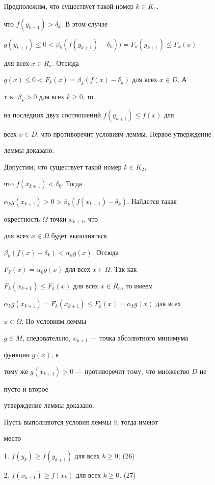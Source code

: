 \begin{pf} Предположим, что существует такой номер $k\in K_1$, 


что $f(y_{k+1})>\delta_k$. В этом случае 


$g(y_{k+1})\le 0<\beta_k(f(y_{k+1})-\delta_k))= 


F_k(y_{k+1})\le F_k(x)$ 


для всех $x\in R_n$. Отсюда 


$g(x)\le 0<F_k(x)=\beta_k(f(x)-\delta_k)$ для всех $x\in D$. А 


т.\,к.{} $\beta_k>0$ для всех $k\ge 0$, то  


из последних двух соотношений $f(y_{k+1})\le f(x)$ для 


всех $x\in D$, что противоречит условиям леммы. Первое утверждение 


леммы доказано. 


 


Допустим, что существует такой номер $k\in K_2$,


что $f(x_{k+1})<\delta_k$. Тогда 


$\alpha_k g(x_{k+1})>0>\beta_k(f(x_{k+1})-\delta_k)$. Найдется такая 


окрестность $\Omega$ точки $x_{k+1}$, что 


для всех $x\in\Omega$ будет выполняться 


$\beta_k(f(x)-\delta_k)<\alpha_k g(x)$. Отсюда 


$F_k(x)=\alpha_k g(x)$ для всех $x\in\Omega$. Так как 


$F_k(x_{k+1})\le{}F_k(x)$ для всех $x\in R_n$, то имеем 


$\alpha_k g(x_{k+1})=F_k(x_{k+1})\le F_k(x)=\alpha_k g(x)$ для всех 


$x\in\Omega$. По условиям леммы 


$g\in M$, следовательно, $x_{k+1}$ --- точка абсолютного минимума 


функции $g(x)$, к 


тому же $g(x_{k+1})>0$ --- противоречит тому, что множество $D$ не 


пусто и второе 


утверждение леммы доказано. 


\end{pf} 


 


\begin{cornonum} Пусть выполняются условия леммы 9, тогда имеют 


место 





1. $f(y_k)\ge f(y_{k+1})$ для всех $k\ge 0$; \hfill (26) 


 


2. $f(x_{k+1})\ge f(x_k)$ для всех $k\ge 0$. \hfill (27) 


\end{cornonum}


